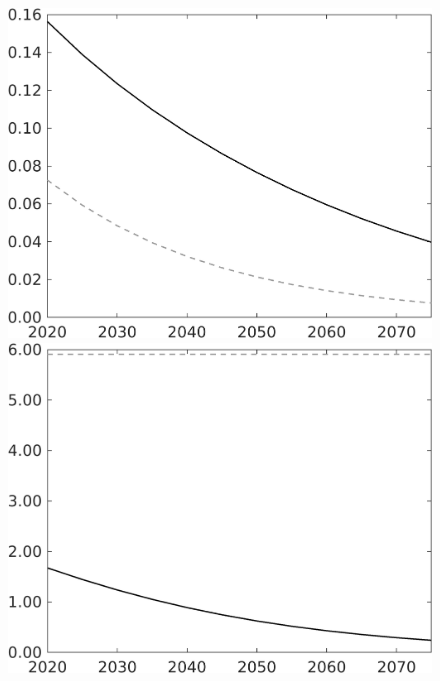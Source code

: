 \documentclass[12pt]{article}
\begin{document}
\begin{figure}[h!!]
\begin{minipage}[]{0.32\textwidth}
\end{minipage}	
\begin{minipage}[]{0.32\textwidth}
\includegraphics[width=1\textwidth]{../../codding_model/own_basedOnFried/optimalPol_010922_revision/figures/all_13Sept22/LevTaufNoTauf_TaulCalib_Equlab_regime0_pee_spillover0_nsk1_xgr1_knspil1_sep1_LFlimit0_emsbase0_countec0_GovRev0_etaa0.79_lgd0.png}
\end{minipage}	
\begin{minipage}[]{0.32\textwidth}
\includegraphics[width=1\textwidth]{../../codding_model/own_basedOnFried/optimalPol_010922_revision/figures/all_13Sept22/LevTaufNoTauf_TaulCalib_Equlab_regime0_pgpftf_spillover0_nsk1_xgr1_knspil1_sep1_LFlimit0_emsbase0_countec0_GovRev0_etaa0.79_lgd0.png}

\end{minipage}
\end{figure}
\end{document}

